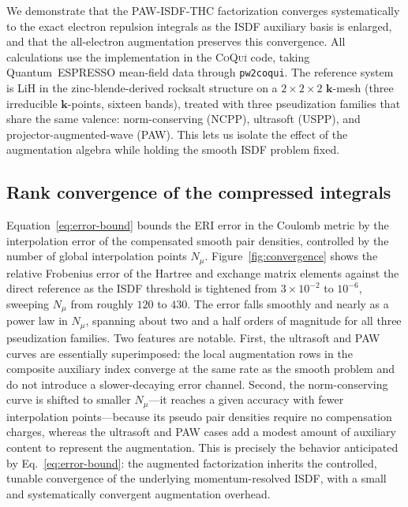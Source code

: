 \documentclass[aps,prb,reprint,superscriptaddress,longbibliography,nofootinbib]{revtex4-2}
\newcommand{\bk}{\mathbf k}
\begin{document}
We demonstrate that the PAW-ISDF-THC factorization converges systematically to
the exact electron repulsion integrals as the ISDF auxiliary basis is enlarged,
and that the all-electron augmentation preserves this convergence.  All
calculations use the implementation in the \textsc{CoQu\'i} code, taking
Quantum~ESPRESSO mean-field data through \texttt{pw2coqui}.  The reference
system is LiH in the zinc-blende-derived rocksalt structure on a
\(2\times2\times2\) \(\bk\)-mesh (three irreducible \(\bk\)-points, sixteen
bands), treated with three pseudization families that share the same valence:
norm-conserving (NCPP), ultrasoft (USPP), and projector-augmented-wave (PAW).
This lets us isolate the effect of the augmentation algebra while holding the
smooth ISDF problem fixed.

\subsection{Rank convergence of the compressed integrals}
\label{sec:numerics-eri}

Equation~\eqref{eq:error-bound} bounds the ERI error in the Coulomb metric by
the interpolation error of the compensated smooth pair densities, controlled by
the number of global interpolation points \(N_\mu\).  Figure~\ref{fig:convergence}
shows the relative Frobenius error of the Hartree and exchange matrix elements
against the direct reference as the ISDF threshold is tightened from
\(3\times10^{-2}\) to \(10^{-6}\), sweeping \(N_\mu\) from roughly \(120\) to
\(430\).  The error falls smoothly and nearly as a power law in \(N_\mu\),
spanning about two and a half orders of magnitude for all three pseudization
families.  Two features are notable.  First, the ultrasoft and PAW curves are
essentially superimposed: the local augmentation rows in the composite
auxiliary index converge at the same rate as the smooth problem and do not
introduce a slower-decaying error channel.  Second, the norm-conserving curve
is shifted to smaller \(N_\mu\)---it reaches a given accuracy with fewer
interpolation points---because its pseudo pair densities require no compensation
charges, whereas the ultrasoft and PAW cases add a modest amount of auxiliary
content to represent the augmentation.  This is precisely the behavior
anticipated by Eq.~\eqref{eq:error-bound}: the augmented factorization inherits
the controlled, tunable convergence of the underlying momentum-resolved ISDF,
with a small and systematically convergent augmentation overhead.
\end{document}
